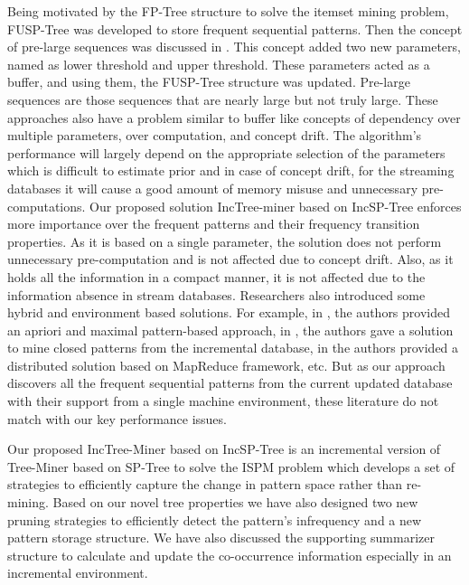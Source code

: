 Being motivated by the FP-Tree\cite{grahne2005fast} structure to solve the itemset mining problem, FUSP-Tree was developed to store frequent sequential patterns. Then the concept of pre-large sequences was discussed in \cite{hong2001new,hong2011incremental,lin2015incrementally}. This concept added two new parameters, named as lower threshold and upper threshold. These parameters acted as a buffer, and using them, the FUSP-Tree structure was updated. Pre-large sequences are those sequences that are nearly large but not truly large. These approaches also have a problem similar to buffer like concepts of dependency over multiple parameters, over computation, and concept drift. The algorithm’s performance will largely depend on the appropriate selection of the parameters which is difficult to estimate prior and in case of concept drift, for the streaming databases it will cause a good amount of memory misuse and unnecessary pre-computations. Our proposed solution IncTree-miner based on IncSP-Tree enforces more importance over the frequent patterns and their frequency transition properties. As it is based on a single parameter, the solution does not perform unnecessary pre-computation and is not affected due to concept drift. Also, as it holds all the information in a compact manner, it is not affected due to the information absence in stream databases. Researchers also introduced some hybrid and environment based solutions. For example, in \cite{lin2007discover}, the authors provided an apriori and maximal pattern-based approach, in \cite{chang2007imcs}, the authors gave a solution to mine closed patterns from the incremental database, in \cite{saleti2019mapreduce} the authors provided a distributed solution based on MapReduce framework, etc. But as our approach discovers all the frequent sequential patterns from the current updated database with their support from a single machine environment, these literature do not match with our key performance issues.



Our proposed IncTree-Miner based on IncSP-Tree is an incremental version of Tree-Miner based on SP-Tree to solve the ISPM problem which develops a set of strategies to efficiently capture the change in pattern space rather than re-mining. Based on our novel tree properties we have also designed two new pruning strategies to efficiently detect the pattern's infrequency and a new pattern storage structure. We have also discussed the supporting summarizer structure to calculate and update the co-occurrence information especially in an incremental environment.

